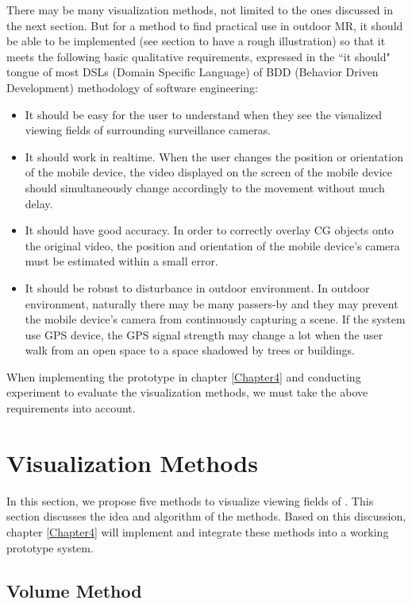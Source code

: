 There may be many visualization methods, not limited to the ones discussed in the next section. But for a method to find practical use in outdoor MR, it should be able to be implemented (see section \cite{AUseCase} to have a rough illustration) so that it meets the following basic qualitative requirements, expressed in the ``it should" tongue of most DSLs (Domain Specific Language) of BDD (Behavior Driven Development) methodology of software engineering:
\begin{itemize}
	\item It should be easy for the user to understand when they see the visualized viewing fields of surrounding surveillance cameras.
	\item It should work in realtime. When the user changes the position or orientation of the mobile device, the video displayed on the screen of the mobile device should simultaneously change accordingly to the movement without much delay.
	\item It should have good accuracy. In order to correctly overlay CG objects onto the original video, the position and orientation of the mobile device's camera must be estimated within a small error.
	\item It should be robust to disturbance in outdoor environment. In outdoor environment, naturally there may be many passers-by and they may prevent the mobile device's camera from continuously capturing a scene. If the system use GPS device, the GPS signal strength may change a lot when the user walk from an open space to a space shadowed by trees or buildings.
\end{itemize}

When implementing the prototype in chapter \ref{Chapter4} and conducting experiment to evaluate the visualization methods, we must take the above requirements into account.

\section{Visualization Methods}
\label{VisualizationMethods}

In this section, we propose five methods to visualize viewing fields of . This section discusses the idea and algorithm of the methods. Based on this discussion, chapter \ref{Chapter4} will implement and integrate these methods into a working prototype system.

\subsection{Volume Method}

